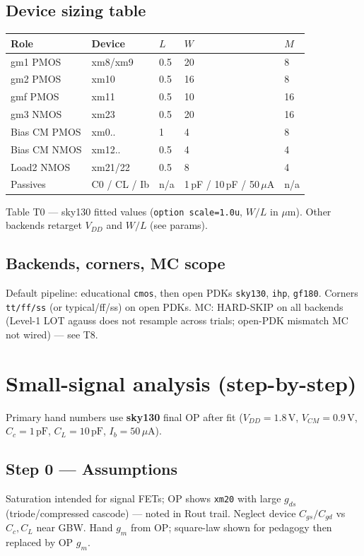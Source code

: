 \documentclass[11pt]{article}
\begin{document}
\subsection{Device sizing table}
\begin{center}
{\small
\begin{tabular}{@{}lllll@{}}
\toprule
Role & Device & \(L\) & \(W\) & \(M\) \\
\midrule
gm1 PMOS & xm8/xm9 & 0.5 & 20 & 8 \\
gm2 PMOS & xm10 & 0.5 & 16 & 8 \\
gmf PMOS & xm11 & 0.5 & 10 & 16 \\
gm3 NMOS & xm23 & 0.5 & 20 & 16 \\
Bias CM PMOS & xm0.. & 1 & 4 & 8 \\
Bias CM NMOS & xm12.. & 0.5 & 4 & 4 \\
Load2 NMOS & xm21/22 & 0.5 & 8 & 4 \\
Passives & C0 / CL / Ib & n/a & 1\,pF / 10\,pF / 50\,\(\mu\)A & n/a \\
\bottomrule
\end{tabular}}
\end{center}
\footnotesize Table T0 --- sky130 fitted values (\texttt{option scale=1.0u}, \(W/L\) in \(\mu\mathrm{m}\)). Other backends retarget \(V_{DD}\) and \(W/L\) (see params).

\subsection{Backends, corners, MC scope}
Default pipeline: educational \texttt{cmos}, then open PDKs \texttt{sky130}, \texttt{ihp}, \texttt{gf180}.
Corners \texttt{tt/ff/ss} (or typical/ff/ss) on open PDKs.
MC: HARD-SKIP on all backends (Level-1 LOT agauss does not resample across trials; open-PDK mismatch MC not wired) --- see T8.

\section{Small-signal analysis (step-by-step)}
Primary hand numbers use \textbf{sky130} final OP after fit (\(V_{DD}=1.8\,\mathrm{V}\), \(V_{CM}=0.9\,\mathrm{V}\), \(C_c=1\,\mathrm{pF}\), \(C_L=10\,\mathrm{pF}\), \(I_b=50\,\mu\mathrm{A}\)).

\subsection{Step 0 --- Assumptions}
Saturation intended for signal FETs; OP shows \texttt{xm20} with large \(g_{ds}\) (triode/compressed cascode) --- noted in Rout trail.
Neglect device \(C_{gs}/C_{gd}\) vs \(C_c,C_L\) near GBW.
Hand \(g_m\) from OP; square-law shown for pedagogy then replaced by OP \(g_m\).
\end{document}
